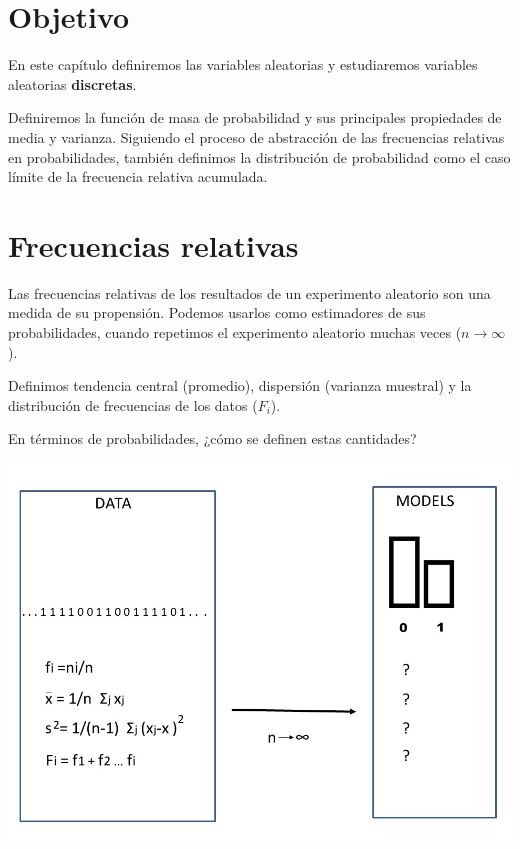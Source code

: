\documentclass[
]{book}
\begin{document}
\hypertarget{objetivo-1}{%
\section{Objetivo}\label{objetivo-1}}

En este capítulo definiremos las variables aleatorias y estudiaremos variables aleatorias \textbf{discretas}.

Definiremos la función de masa de probabilidad y sus principales propiedades de media y varianza. Siguiendo el proceso de abstracción de las frecuencias relativas en probabilidades, también definimos la distribución de probabilidad como el caso límite de la frecuencia relativa acumulada.

\hypertarget{frecuencias-relativas-2}{%
\section{Frecuencias relativas}\label{frecuencias-relativas-2}}

Las frecuencias relativas de los resultados de un experimento aleatorio son una medida de su propensión. Podemos usarlos como estimadores de sus probabilidades, cuando repetimos el experimento aleatorio muchas veces (\(n \rightarrow \infty\)).

Definimos tendencia central (promedio), dispersión (varianza muestral) y la distribución de frecuencias de los datos (\(F_i\)).

En términos de probabilidades, ¿cómo se definen estas cantidades?

\includegraphics{./figures/randomvar.JPG}
\end{document}
